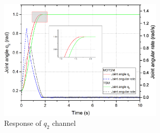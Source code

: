 \documentclass[3p]{elsarticle}
\theoremstyle{plain}
\theoremstyle{remark}
\begin{document}
\begin{figure}[http]
\centering
\includegraphics[width=0.7\textwidth]{paper3_fig5.eps}
\caption{Response of $q_2$ channel}
\label{Figure:5}
\end{figure}
\end{document}
